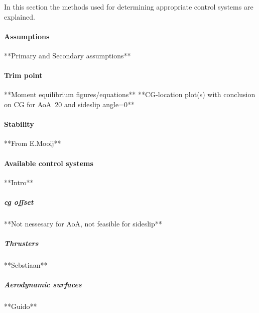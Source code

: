 In this section the methods used for determining appropriate control systems are explained. 

\paragraph{Assumptions}

**Primary and Secondary assumptions**

\paragraph{Trim point}

**Moment equilibrium figures/equations**
**CG-location plot(s)  with conclusion on CG for AoA~20 and sideslip angle=0**

\paragraph{Stability}

**From E.Mooij**

\paragraph{Available control systems}

**Intro**

\subparagraph{\acrfull{cg} offset}

**Not nessesary for AoA, not feasible for sideslip**

\subparagraph{Thrusters}

**Sebstiaan**

\subparagraph{Aerodynamic surfaces}

**Guido**



